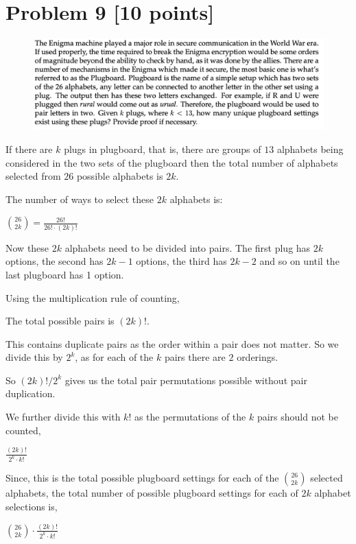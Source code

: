 \documentclass{ashoka-crypto}
\begin{document}
\clearpage
\section*{Problem 9 [10 points]}

\begin{figure}[h]
\includegraphics[width=17cm]{9}
\end{figure}

If there are $k$ plugs in plugboard, that is, there are groups of $13$ alphabets being considered in the two sets of the plugboard then the total number of alphabets selected from $26$ possible alphabets is $2k$.

The number of ways to select these $2k$ alphabets is:

\begin{math}
\binom{26}{2k} = \frac{26!}{26! \cdot (2k)!}
\end{math}

Now these $2k$ alphabets need to be divided into pairs. The first plug has $2k$ options, the second has $2k-1$ options, the third has $2k-2$ and so on until the last plugboard has 1 option.

Using the multiplication rule of counting,

The total possible pairs is $(2k)!$. 

This contains duplicate pairs as the order within a pair does not matter. So we divide this by $2^k$, as for each of the $k$ pairs there are $2$ orderings.

So $(2k)!/2^k$ gives us the total pair permutations possible without pair duplication.

We further divide this with $k!$ as the permutations of the $k$ pairs should not be counted,

$\frac{(2k)!}{2^k\cdot k!}$

Since, this is the total possible plugboard settings for each of the $\binom{26}{2k}$ selected alphabets, the total number of possible plugboard settings for each of $2k$ alphabet selections is,

\begin{math}
\binom{26}{2k}\cdot \frac{(2k)!}{2^k\cdot k!}
\end{math}
\end{document}
